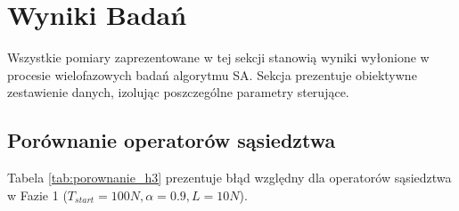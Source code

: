 \documentclass[conference]{IEEEtran}
\begin{document}
    \section{Wyniki Badań}
        Wszystkie pomiary zaprezentowane w tej sekcji stanowią wyniki wyłonione w procesie wielofazowych badań algorytmu SA. Sekcja prezentuje obiektywne zestawienie danych, izolując poszczególne parametry sterujące.
        \subsection{Porównanie operatorów sąsiedztwa}
            Tabela \ref{tab:porownanie_h3} prezentuje błąd względny dla operatorów sąsiedztwa w Fazie 1 ($T_{start}=100N, \alpha=0.9, L=10N$).
            \begin{table}[H]
                \centering
                \caption{Porównanie błędów operatorów sąsiedztwa dla instancji TSP \\ i ATSP}
                \label{tab:porownanie_h3}
            \end{table}
\end{document}
